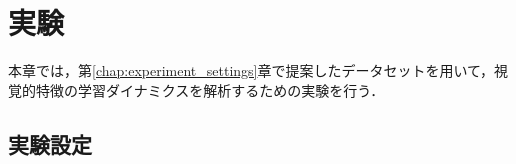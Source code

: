 \chapter{実験}
\label{chap:experiment}

本章では，第\ref{chap:experiment_settings}章で提案したデータセットを用いて，視覚的特徴の学習ダイナミクスを解析するための実験を行う．

\section{実験設定}
\label{sec:experiment_settings}
